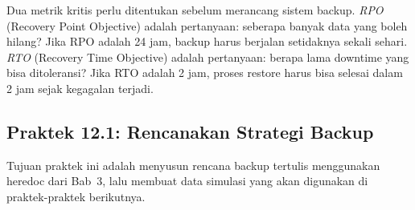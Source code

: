 Dua metrik kritis perlu ditentukan sebelum merancang sistem backup. \emph{RPO}
(Recovery Point Objective) adalah pertanyaan: seberapa banyak data yang boleh
hilang? Jika RPO adalah 24 jam, backup harus berjalan setidaknya sekali sehari.
\emph{RTO} (Recovery Time Objective) adalah pertanyaan: berapa lama downtime
yang bisa ditoleransi? Jika RTO adalah 2 jam, proses restore harus bisa selesai
dalam 2 jam sejak kegagalan terjadi.

\subsection*{Praktek 12.1: Rencanakan Strategi Backup}

Tujuan praktek ini adalah menyusun rencana backup tertulis menggunakan heredoc
dari Bab~3, lalu membuat data simulasi yang akan digunakan di praktek-praktek
berikutnya.

